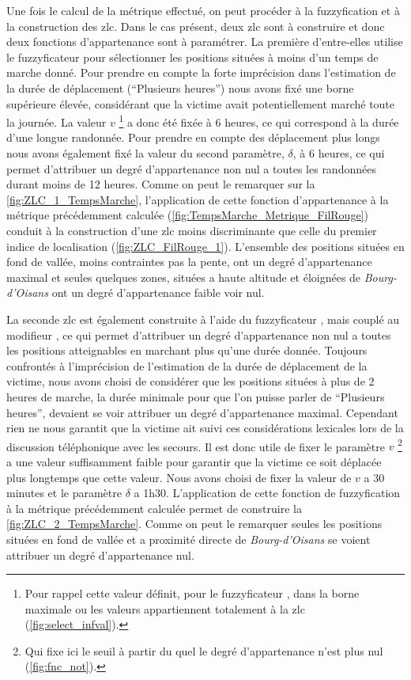 Une fois le calcul de la métrique effectué, on peut procéder à la
fuzzyfication et à la construction des \ac{zlc}. Dans le cas présent,
deux \ac{zlc} sont à construire et donc deux fonctions d'appartenance
sont à paramétrer. La première d'entre-elles utilise le fuzzyficateur
 pour sélectionner les positions situées à moins
d'un temps de marche donné. Pour prendre en compte la forte
imprécision dans l'estimation de la durée de déplacement
(\enquote{Plusieurs heures}) nous avons fixé une borne supérieure
élevée, considérant que la victime avait potentiellement marché toute
la journée. La valeur \(v\) \footnote{Pour rappel cette valeur
  définit, pour le fuzzyficateur , dans la borne
  maximale ou les valeurs appartiennent totalement à la \ac{zlc}
  (\autoref{fig:select_infval}).} a donc été fixée à 6 heures, ce qui
correspond à la durée d'une longue randonnée. Pour prendre en compte
des déplacement plus longs nous avons également fixé la valeur du
second paramètre, \(\delta\), à 6 heures, ce qui permet d'attribuer un
degré d'appartenance non nul a toutes les randonnées durant moins de
12 heures. Comme on peut le remarquer sur la
\autoref{fig:ZLC_1_TempsMarche}, l’application de cette fonction
d'appartenance à la métrique précédemment calculée
(\autoref{fig:TempsMarche_Metrique_FilRouge}) conduit à la
construction d'une \ac{zlc} moins discriminante que celle du premier
indice de localisation (\autoref{fig:ZLC_FilRouge_1}). L'ensemble des
positions situées en fond de vallée, moins contraintes pas la pente,
ont un degré d'appartenance maximal et seules quelques zones, situées
a haute altitude et éloignées de \emph{Bourg-d'Oisans} ont un degré
d'appartenance faible voir nul.

La seconde \ac{zlc} est également construite à l'aide du fuzzyficateur
, mais couplé au modifieur , ce
qui permet d'attribuer un degré d'appartenance non nul a toutes les
positions atteignables en marchant plus qu'une durée donnée. Toujours
confrontés à l'imprécision de l'estimation de la durée de déplacement
de la victime, nous avons choisi de considérer que les positions
situées à plus de 2 heures de marche, la durée minimale pour que l'on
puisse parler de \enquote{Plusieurs heures}, devaient se voir
attribuer un degré d'appartenance maximal. Cependant rien ne nous
garantit que la victime ait suivi ces considérations lexicales lors de
la discussion téléphonique avec les secours. Il est donc utile de
fixer le paramètre \(v\) \footnote{Qui fixe ici le seuil à partir du
  quel le degré d'appartenance n'est plus nul
  (\autoref{fig:fnc_not}).} a une valeur suffisamment faible pour
garantir que la victime ce soit déplacée plus longtemps que cette
valeur. Nous avons choisi de fixer la valeur de \(v\) a 30 minutes et
le paramètre \(\delta\) a 1h30. L’application de cette fonction de
fuzzyfication à la métrique précédemment calculée permet de construire
la \autoref{fig:ZLC_2_TempsMarche}. Comme on peut le remarquer seules
les positions situées en fond de vallée et a proximité directe de
\emph{Bourg-d'Oisans} se voient attribuer un degré d'appartenance nul.

